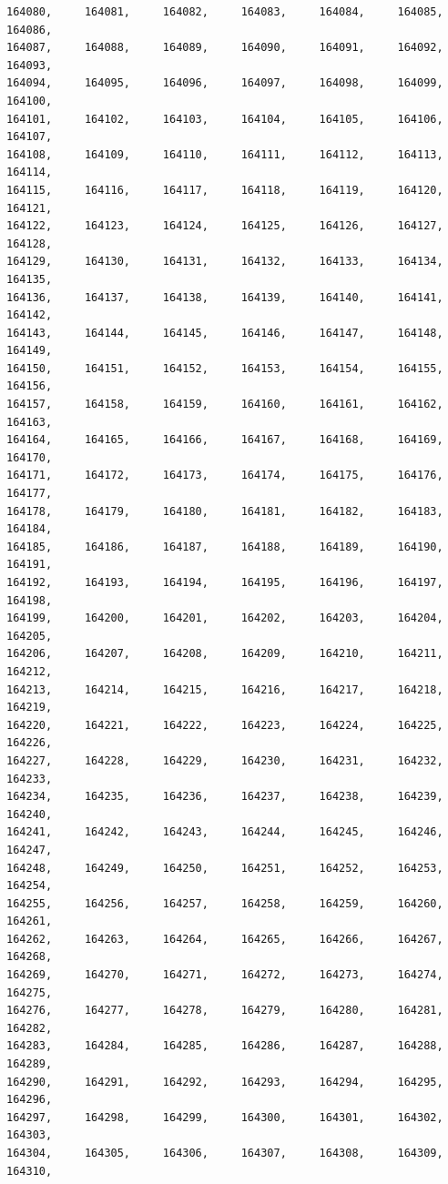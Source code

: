 \documentclass[a4paper,11pt]{report}
\begin{document}
\begin{verbatim}
164080,     164081,     164082,     164083,     164084,     164085,     164086,
164087,     164088,     164089,     164090,     164091,     164092,     164093,
164094,     164095,     164096,     164097,     164098,     164099,     164100,
164101,     164102,     164103,     164104,     164105,     164106,     164107,
164108,     164109,     164110,     164111,     164112,     164113,     164114,
164115,     164116,     164117,     164118,     164119,     164120,     164121,
164122,     164123,     164124,     164125,     164126,     164127,     164128,
164129,     164130,     164131,     164132,     164133,     164134,     164135,
164136,     164137,     164138,     164139,     164140,     164141,     164142,
164143,     164144,     164145,     164146,     164147,     164148,     164149,
164150,     164151,     164152,     164153,     164154,     164155,     164156,
164157,     164158,     164159,     164160,     164161,     164162,     164163,
164164,     164165,     164166,     164167,     164168,     164169,     164170,
164171,     164172,     164173,     164174,     164175,     164176,     164177,
164178,     164179,     164180,     164181,     164182,     164183,     164184,
164185,     164186,     164187,     164188,     164189,     164190,     164191,
164192,     164193,     164194,     164195,     164196,     164197,     164198,
164199,     164200,     164201,     164202,     164203,     164204,     164205,
164206,     164207,     164208,     164209,     164210,     164211,     164212,
164213,     164214,     164215,     164216,     164217,     164218,     164219,
164220,     164221,     164222,     164223,     164224,     164225,     164226,
164227,     164228,     164229,     164230,     164231,     164232,     164233,
164234,     164235,     164236,     164237,     164238,     164239,     164240,
164241,     164242,     164243,     164244,     164245,     164246,     164247,
164248,     164249,     164250,     164251,     164252,     164253,     164254,
164255,     164256,     164257,     164258,     164259,     164260,     164261,
164262,     164263,     164264,     164265,     164266,     164267,     164268,
164269,     164270,     164271,     164272,     164273,     164274,     164275,
164276,     164277,     164278,     164279,     164280,     164281,     164282,
164283,     164284,     164285,     164286,     164287,     164288,     164289,
164290,     164291,     164292,     164293,     164294,     164295,     164296,
164297,     164298,     164299,     164300,     164301,     164302,     164303,
164304,     164305,     164306,     164307,     164308,     164309,     164310,

\end{verbatim}
\end{document}
